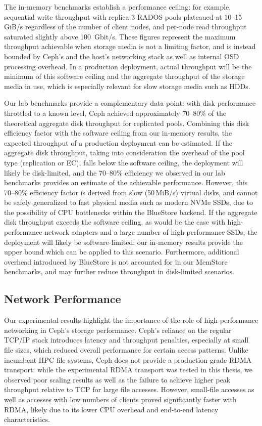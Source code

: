 The in-memory benchmarks establish a performance ceiling: for example, sequential write throughput with replica-3 \ac{RADOS} pools plateaued at 10--15\,GiB/s regardless of the number of client nodes, and per-node read throughput saturated slightly above 100\ Gbit/s. These figures represent the maximum throughput achievable when storage media is not a limiting factor, and is instead bounded by Ceph's and the host's networking stack as well as internal \ac{OSD} processing overhead. In a production deployment, actual throughput will be the minimum of this software ceiling and the aggregate throughput of the storage media in use, which is especially relevant for slow storage media such as \acp{HDD}.

Our lab benchmarks provide a complementary data point: with disk performance throttled to a known level, Ceph achieved approximately 70--80\% of the theoretical aggregate disk throughput for replicated pools. Combining this disk efficiency factor with the software ceiling from our in-memory results, the expected throughput of a production deployment can be estimated. If the aggregate disk throughput, taking into consideration the overhead of the pool type (replication or \ac{EC}), falls below the software ceiling, the deployment will likely be disk-limited, and the 70--80\% efficiency we observed in our lab benchmarks provides an estimate of the achievable performance. However, this 70--80\% efficiency factor is derived from slow (50\,MiB/s) virtual disks, and cannot be safely generalized to fast physical media such as modern \ac{NVMe} \acp{SSD}, due to the possibility of \ac{CPU} bottlenecks within the BlueStore backend. If the aggregate disk throughput exceeds the software ceiling, as would be the case with high-performance network adapters and a large number of high-performance \acp{SSD}, the deployment will likely be software-limited: our in-memory results provide the upper bound which can be applied to this scenario. Furthermore, additional overhead introduced by BlueStore is not accounted for in our MemStore benchmarks, and may further reduce throughput in disk-limited scenarios.

\subsection{Network Performance}

Our experimental results highlight the importance of the role of high-performance networking in Ceph's storage performance. Ceph's reliance on the regular \ac{TCP/IP} stack introduces latency and throughput penalties, especially at small file sizes, which reduced overall performance for certain access patterns. Unlike incumbent \ac{HPC} file systems, Ceph does not provide a production-grade \ac{RDMA} transport: while the experimental \ac{RDMA} transport was tested in this thesis, we observed poor scaling results as well as the failure to achieve higher peak throughput relative to \acs{TCP} for large file accesses. However, small-file accesses as well as accesses with low numbers of clients proved significantly faster with \ac{RDMA}, likely due to its lower \ac{CPU} overhead and end-to-end latency characteristics.

